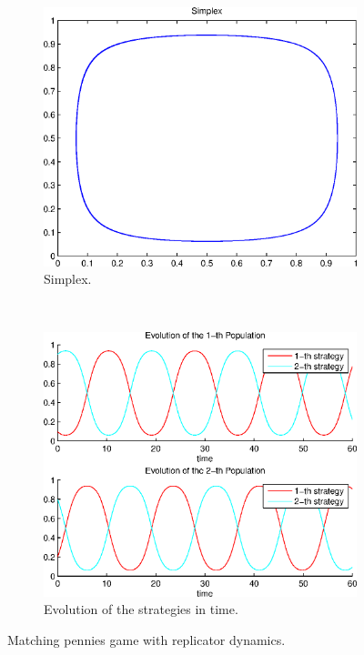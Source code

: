 \begin{figure}[h]
  \centering
  \begin{subfigure}[b]{0.45\textwidth}
	  \includegraphics[width=\textwidth]{./images/test2_simplex_rd.eps}
	  \caption{Simplex.}
	  \label{fig:test2_simplex_rd}
  \end{subfigure}
  ~ 
  \begin{subfigure}[b]{0.45\textwidth}
	  \includegraphics[width=\textwidth]{./images/test2_ev_rd.eps}
	  \caption{Evolution of the strategies in time.}
	  \label{fig:test2_ev_rd}
  \end{subfigure}
  \caption{Matching pennies game with replicator dynamics.}
  \label{fig:mp_game_rd}
\end{figure}



